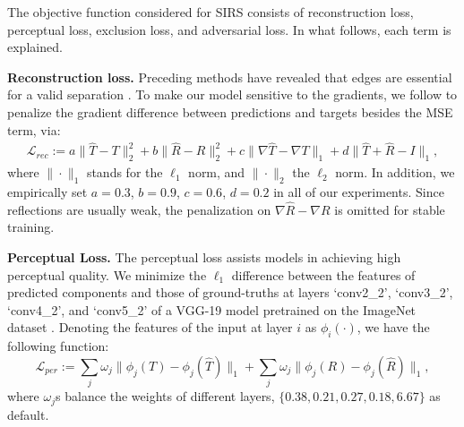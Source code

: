 \documentclass{article}
\begin{document}
The objective function considered for SIRS consists of reconstruction loss, perceptual loss, exclusion loss, and adversarial loss. In what follows, each term is explained. 

\par \noindent \textbf{Reconstruction loss.} Preceding methods have revealed that edges are essential for a valid separation \cite{DBLP:journals/pami/LevinW07,DBLP:journals/tog/Freeman15,DBLP:conf/iccv/FanYHCW17,DBLP:conf/cvpr/WanSDTK18}. To make our model sensitive to the gradients, we follow \cite{DBLP:conf/iccv/FanYHCW17, DBLP:conf/cvpr/WeiYFW019} to penalize the gradient difference between predictions and targets besides the MSE term, via: 
\begin{equation}
\begin{aligned}
    \mathcal{L}_{rec} := a\| \hat{T} - T \|^2_2 + b\|\hat{R} - R\|^2_2 
    + c\|\nabla \hat{T}-\nabla T\|_{1}+d\|\hat{T}+\hat{R} - I\|_{1},
\end{aligned}
\end{equation}
where $\|\cdot\|_1$ stands for the $\ell_1$ norm, and $\|\cdot\|_2$ the $\ell_2$ norm. In addition, we empirically set $a=0.3$, $b=0.9$, $c=0.6$, $d=0.2$ in all of our experiments. Since reflections are usually weak, the penalization on $\nabla\hat{R}-\nabla R$ is omitted for stable training.

\par \noindent \textbf{Perceptual Loss.} The perceptual loss \cite{DBLP:conf/eccv/JohnsonAF16} assists models in achieving high perceptual quality. We minimize the $\ell_1$ difference between the features of predicted components and those of ground-truths at layers `conv2\_2',
`conv3\_2', `conv4\_2', and `conv5\_2' of a VGG-19 model \cite{DBLP:journals/corr/SimonyanZ14a} pretrained on the ImageNet dataset \cite{DBLP:conf/cvpr/DengDSLL009}. Denoting the features of the input at layer $i$ as $\phi_i(\cdot)$, we have the following function:
\begin{equation}
    \mathcal{L}_{per} := \sum_{j} \omega_{j}\|\phi_{j}(T)-\phi_{j}(\hat{T})\|_{1} + \sum_{j} \omega_{j}\|\phi_{j}(R)-\phi_{j}(\hat{R})\|_{1},
\end{equation}
where $\omega_{j}$s balance the weights of different layers, $\{0.38, 0.21, 0.27, 0.18, 6.67\}$ as default.
\end{document}
